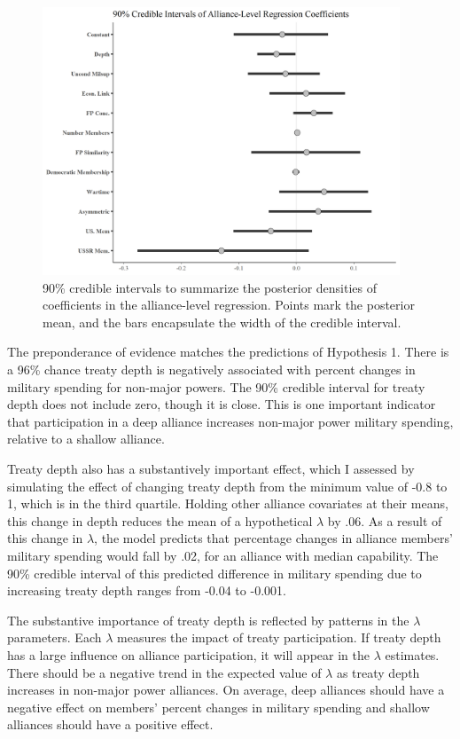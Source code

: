 \documentclass[12pt]{article}
\begin{document}
\begin{figure}[htbp]
	\centering
		\includegraphics[width=0.95\textwidth]{../figures/alliance-reg-nonmaj.png}
	\caption{90\% credible intervals to summarize the posterior densities of coefficients in the alliance-level regression. Points mark the posterior mean, and the bars encapsulate the width of the credible interval.}
	\label{fig:alliance-reg-nonmaj}
\end{figure}


The preponderance of evidence matches the predictions of Hypothesis 1. 
There is a 96\% chance treaty depth is negatively associated with percent changes in military spending for non-major powers.
The 90\% credible interval for treaty depth does not include zero, though it is close. 
This is one important indicator that participation in a deep alliance increases non-major power military spending, relative to a shallow alliance. 


Treaty depth also has a substantively important effect, which I assessed by simulating the effect of changing treaty depth from the minimum value of -0.8 to 1, which is in the third quartile. 
Holding other alliance covariates at their means, this change in depth reduces the mean of a hypothetical $\lambda$ by .06.
As a result of this change in $\lambda$, the model predicts that percentage changes in alliance members' military spending would fall by .02, for an alliance with median capability. 
The 90\% credible interval of this predicted difference in military spending due to increasing treaty depth ranges from -0.04 to -0.001. 


The substantive importance of treaty depth is reflected by patterns in the $\lambda$ parameters. 
Each $\lambda$ measures the impact of treaty participation. 
If treaty depth has a large influence on alliance participation, it will appear in the $\lambda$ estimates. 
There should be a negative trend in the expected value of $\lambda$ as treaty depth increases in non-major power alliances.
On average, deep alliances should have a negative effect on members' percent changes in military spending and shallow alliances should have a positive effect.  
\end{document}

